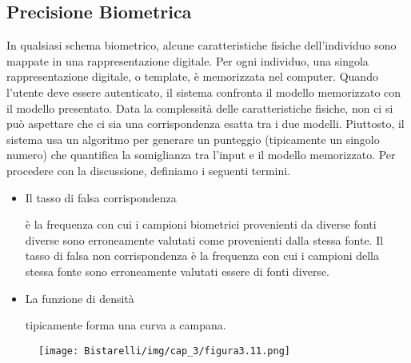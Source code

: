 \subsection{Precisione Biometrica}
In qualsiasi schema biometrico, alcune caratteristiche fisiche dell'individuo sono mappate in una rappresentazione digitale. Per ogni individuo, una singola rappresentazione digitale, o template, è memorizzata nel computer. Quando l'utente deve essere autenticato, il sistema confronta il modello memorizzato con il modello presentato. Data la complessità delle caratteristiche fisiche, non ci si può aspettare che ci sia una corrispondenza esatta tra i due modelli. Piuttosto, il sistema usa un algoritmo per generare un punteggio (tipicamente un singolo numero) che quantifica la somiglianza tra l'input e il modello memorizzato. Per procedere con la discussione, definiamo i seguenti termini.
\begin{itemize}
    \item Il tasso di falsa corrispondenza
    
    è la frequenza con cui i campioni biometrici provenienti da diverse fonti diverse sono erroneamente valutati come provenienti dalla stessa fonte. Il tasso di falsa non corrispondenza è la frequenza con cui i campioni della stessa fonte sono erroneamente valutati essere di fonti diverse.
    
    \item La funzione di densità
    
    tipicamente forma una curva a campana.
\end{itemize}
\begin{figure}[H]
	\centering
    \texttt{[image: Bistarelli/img/cap\_3/figura3.11.png]}
\end{figure}
\singlespacing
